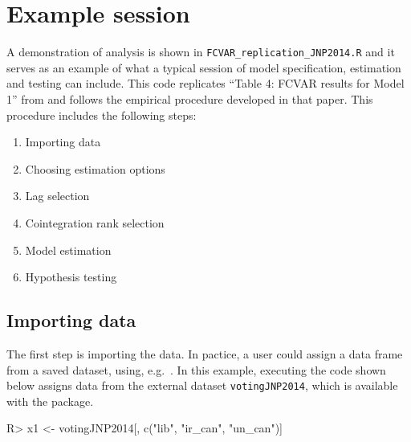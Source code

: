 \documentclass[article]{jss}
\newcommand{\fct}[1]{\code{#1()}}
\begin{document}



\section{Example session} \label{sec:main}

A demonstration of analysis is shown in \verb|FCVAR_replication_JNP2014.R| and it serves as an example of what a typical session of model specification, estimation and testing can include. This code replicates ``Table 4: FCVAR results for Model 1'' from \cite{JNP2014} and follows the empirical procedure developed in that paper. This procedure includes the following steps:

\begin{enumerate}
\item Importing data
\item Choosing estimation options
\item Lag selection
\item Cointegration rank selection
\item Model estimation
\item Hypothesis testing
\end{enumerate}


\subsection{Importing data}

The first step is importing the data. 
In pactice, a user could assign a data frame from a saved dataset, using, e.g.~\fct{read.csv}. 
In this example, executing the code 
shown below assigns data from the external dataset \verb|votingJNP2014|, which is available with the package. 


\begin{Code}
R> x1 <- votingJNP2014[, c("lib", "ir_can", "un_can")]
\end{Code}
\end{document}
